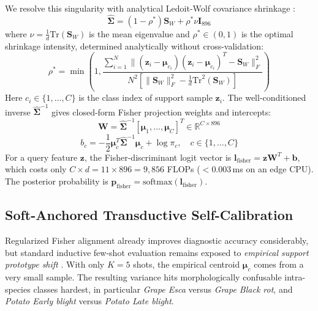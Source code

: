 \documentclass[conference]{IEEEtran}
\begin{document}
We resolve this singularity with analytical Ledoit-Wolf covariance shrinkage \cite{ledoit2004well}:
\begin{equation}
\hat{\mathbf{\Sigma}} = (1 - \rho^*)\mathbf{S}_W + \rho^* \nu \mathbf{I}_{896}
\end{equation}
where $\nu = \frac{1}{d}\text{Tr}(\mathbf{S}_W)$ is the mean eigenvalue and $\rho^* \in (0, 1)$ is the optimal shrinkage intensity, determined analytically without cross-validation:
\begin{equation}
\rho^* = \min\left(1, \frac{\sum_{i=1}^N \|(\mathbf{z}_i - \boldsymbol{\mu}_{c_i})(\mathbf{z}_i - \boldsymbol{\mu}_{c_i})^T - \mathbf{S}_W\|_F^2}{N^2 \left[\|\mathbf{S}_W\|_F^2 - \frac{1}{d}\text{Tr}^2(\mathbf{S}_W)\right]}\right)
\end{equation}
Here $c_i \in \{1,\dots,C\}$ is the class index of support sample $\mathbf{z}_i$. The well-conditioned inverse $\hat{\mathbf{\Sigma}}^{-1}$ gives closed-form Fisher projection weights and intercepts:
\begin{equation}
\mathbf{W} = \hat{\mathbf{\Sigma}}^{-1} [\boldsymbol{\mu}_1, \dots, \boldsymbol{\mu}_C]^T \in \mathbb{R}^{C \times 896}
\end{equation}
\begin{equation}
b_c = -\frac{1}{2} \boldsymbol{\mu}_c^T \hat{\mathbf{\Sigma}}^{-1} \boldsymbol{\mu}_c + \log \pi_c, \quad c \in \{1, \dots, C\}
\end{equation}
For a query feature $\mathbf{z}$, the Fisher-discriminant logit vector is $\mathbf{l}_{\text{fisher}} = \mathbf{z} \mathbf{W}^T + \mathbf{b}$, which costs only $C \times d = 11 \times 896 = 9,856$ FLOPs ($<0.003$\,ms on an edge CPU). The posterior probability is $\mathbf{p}_{\text{fisher}} = \text{softmax}(\mathbf{l}_{\text{fisher}})$.

\subsection{Soft-Anchored Transductive Self-Calibration}
Regularized Fisher alignment already improves diagnostic accuracy considerably, but standard inductive few-shot evaluation remains exposed to \textit{empirical support prototype shift} \cite{boudiaf2020transductive}. With only $K=5$ shots, the empirical centroid $\boldsymbol{\mu}_c$ comes from a very small sample. The resulting variance hits morphologically confusable intra-species classes hardest, in particular \textit{Grape Esca} versus \textit{Grape Black rot}, and \textit{Potato Early blight} versus \textit{Potato Late blight}.
\end{document}
